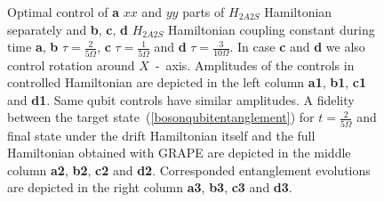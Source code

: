 \documentclass[
aps,%
12pt,%
final,%
notitlepage,%
oneside,%
onecolumn,%
nobibnotes,%
nofootinbib,%
superscriptaddress,%
noshowpacs,%
centertags]%
{revtex4}
\begin{document}
\begin{figure}[t!]
\setcaptionmargin{5mm}
\onelinecaptionsfalse
{}
\caption{
    Optimal control of {\bf a} $xx$ and $yy$ parts of $H_{2A2S}$ Hamiltonian separately and {\bf b}, {\bf c}, {\bf d} $H_{2A2S}$ Hamiltonian coupling constant during time {\bf a}, {\bf b} $\tau=\frac{2}{5\Omega}$, {\bf c} $\tau=\frac{1}{5\Omega}$ and {\bf d} $\tau=\frac{3}{10\Omega}$. In case {\bf c} and {\bf d} we also control rotation around $X$~-~axis. Amplitudes of the controls in controlled Hamiltonian are depicted in the left column {\bf a1}, {\bf b1}, {\bf c1} and {\bf d1}. Same qubit controls have similar amplitudes. A fidelity between the target state~(\ref{bosonqubitentanglement}) for $t=\frac{2}{5\Omega}$ and final state under the drift Hamiltonian itself and the full Hamiltonian obtained with GRAPE are depicted in the middle column {\bf a2}, {\bf b2}, {\bf c2} and {\bf d2}. Corresponded entanglement evolutions are depicted in the right column {\bf a3}, {\bf b3}, {\bf c3} and {\bf d3}.
}
\label{fig3:time-depended}
\end{figure}
\end{document}
